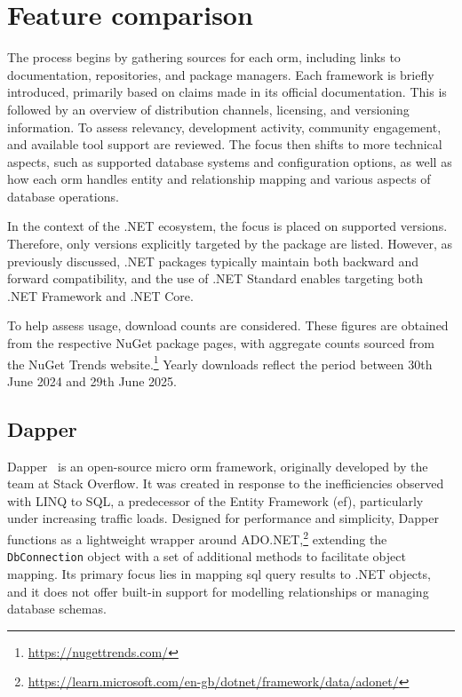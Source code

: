 \section{Feature comparison}
The process begins by gathering sources for each \acrshort{orm}, including links to documentation, repositories, and package managers. Each framework is briefly introduced, primarily based on claims made in its official documentation. This is followed by an overview of distribution channels, licensing, and versioning information. To assess relevancy, development activity, community engagement, and available tool support are reviewed. The focus then shifts to more technical aspects, such as supported database systems and configuration options, as well as how each \acrshort{orm} handles entity and relationship mapping and various aspects of database operations.

In the context of the .NET ecosystem, the focus is placed on supported versions. Therefore, only versions explicitly targeted by the package are listed. However, as previously discussed, .NET packages typically maintain both backward and forward compatibility, and the use of .NET Standard enables targeting both .NET Framework and .NET Core.

To help assess usage, download counts are considered. These figures are obtained from the respective NuGet package pages, with aggregate counts sourced from the NuGet Trends website.\footnote{\url{https://nugettrends.com/}} Yearly downloads reflect the period between 30th June 2024 and 29th June 2025.

\subsection{Dapper}
\label{sec:feat_dapper}

Dapper~\cite{Dapper,DapperRepo} is an open-source micro \acrshort{orm} framework, originally developed by the team at Stack Overflow. It was created in response to the inefficiencies observed with LINQ to SQL, a predecessor of the Entity Framework (\acrshort{ef}), particularly under increasing traffic loads. Designed for performance and simplicity, Dapper functions as a lightweight wrapper around ADO.NET,\footnote{\url{https://learn.microsoft.com/en-gb/dotnet/framework/data/adonet/}} extending the \texttt{DbConnection} object with a set of additional methods to facilitate object mapping. Its primary focus lies in mapping \acrshort{sql} query results to .NET objects, and it does not offer built-in support for modelling relationships or managing database schemas.

